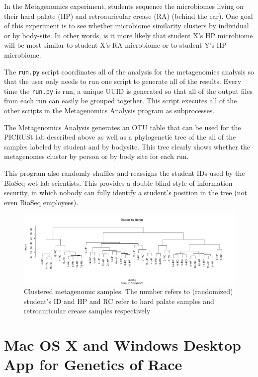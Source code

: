 \documentclass{report}
\begin{document}
\noindent In the Metagenomics experiment, students sequence the microbiomes living on their hard palate (HP) and retroauricular crease (RA) (behind the ear). One goal of this experiment is to see whether microbiome similarity clusters by individual or by body-site. In other words, is it more likely that student X's HP microbiome will be most similar to student X's RA microbiome or to student Y's HP microbiome.

The \texttt{run.py} script coordinates all of the analysis for the metagenomics analysis so that the user only needs to run one script to generate all of the results. Every time the \texttt{run.py} is run, a unique UUID is generated so that all of the output files from each run can easily be grouped together. This script executes all of the other scripts in the Metagenomics Analysis program as subprocesses.

The Metagenomics Analysis generates an OTU table that can be used for the PICRUSt lab described above as well as a phylogenetic tree of the all of the samples labeled by student and by bodysite. This tree clearly shows whether the metagenomes cluster by person or by body site for each run. 

This program also randomly shuffles and reassigns the student IDs used by the BioSeq wet lab scientists. This provides a double-blind style of information security, in which nobody can fully identify a student's position in the tree (not even BioSeq employees). 

\begin{figure}[h]
\includegraphics[width=\linewidth]{tree.pdf}
\caption{Clustered metagenomic samples. The number refers to (randomized) student's ID and HP and RC refer to hard palate samples and retroauricular crease samples respectively}
\end{figure}

\section{Mac OS X and Windows Desktop App for Genetics of Race}
\end{document}
